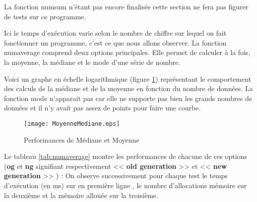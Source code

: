La fonction numsum n'\'etant pas encore finalis\'ee cette section ne fera pas figurer de tests sur ce programme.
\newline

Ici le temps d'ex\'ecution varie selon le nombre de chiffre sur lequel on fait fonctionner un programme, c'est ce que nous allons observer.
La fonction numaverage comprend deux options principales. Elle permet de calculer \`a la fois, la moyenne, la m\'ediane et le mode d'une s\'erie de nombre.
\newline

Voici un graphe en \'echelle logarithmique (figure \ref{tab:medmoy}) repr\'esentant le comportement des calculs de la m\'ediane et de la moyenne en fonction du nombre de 
donn\'ees. La fonction mode n'apparait pas car elle ne supporte pas bien les grands nombres de donn\'ees et il n'y avait pas assez de points pour faire une courbe.

\begin{figure}[h]
\begin{center}
\texttt{[image: MoyenneMediane.eps]}
\end{center}
\caption{Performances de M\'ediane et Moyenne}
\label{tab:medmoy}
\end{figure}

Le tableau \ref{tab:numaverage} montre les performances de chacune de ces options (\textbf{og} et \textbf{ng} signifiant respectivement << \textbf{old generation} >> et << \textbf{new generation} >> ) : 
\newline
On observe successivement pour chaque test le temps d'ex\'ecution (en ms) sur en premi\`ere ligne , le nombre d'allocations m\'emoire sur la deuxi\`eme et la m\'emoire
allou\'ee sur la troisi\`eme.
\newline

